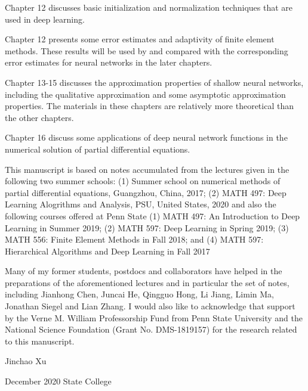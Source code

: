 Chapter 12 discusses basic initialization and normalization
techniques that are used in deep learning. 


Chapter 12 presents some error estimates and adaptivity of finite
element methods. These results will be used by and compared with the corresponding
error estimates for neural networks in the later chapters. 

Chapter 13-15 discusses the approximation properties of shallow neural
networks, including the qualitative approximation and some asymptotic
approximation properties.  The materials in these chapters are
relatively more theoretical than the other chapters. 

Chapter 16 discuss some applications of deep neural network  functions
in the numerical solution of partial differential equations. 

This manuscript is based on notes accumulated from the lectures given in the following two
summer schools:
(1) Summer school on numerical methods of partial differential
equations, Guangzhou, China, 2017; (2)
MATH 497: Deep Learning Alogrithms and Analysis, PSU, United States, 2020
and also the following courses offered at Penn State
(1) MATH 497: An Introduction to Deep Learning in Summer 2019; 
(2) MATH 597: Deep Learning in  Spring 2019;
(3) MATH 556: Finite Element Methods in Fall 2018; and
(4) MATH 597: Hierarchical Algorithms and Deep Learning in Fall 2017  

Many of my former students, postdocs and collaborators have helped in
the preparations of the aforementioned lectures and in particular the
set of notes, including Jianhong Chen, Juncai He, Qingguo Hong, Li
Jiang, Limin Ma, Jonathan Siegel and Lian Zhang.  I would also like to
acknowledge that support by the Verne M. William Professorship Fund
from Penn State University and the National Science Foundation (Grant
No. DMS-1819157) for the research related to this manuscript. 

\bigskip

\noindent Jinchao Xu

\noindent December 2020 State College
